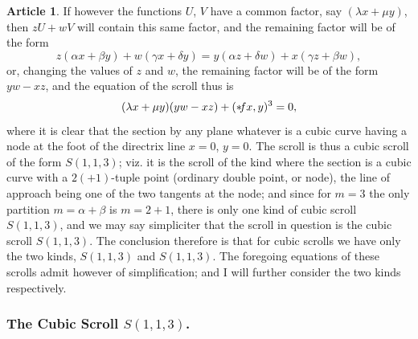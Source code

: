 \documentclass[12pt,a4paper]{article}
\theoremstyle{definition}
\newtheorem{art}{Article}[section]
\begin{document}
\begin{art}
If however the functions $U$, $V$ have a common factor, say $(\lambda x + \mu y)$, then $zU + wV$ will contain this same factor, and the remaining factor will be of the form
\[
z(\alpha x + \beta y) + w(\gamma x + \delta y) = y(\alpha z + \delta w) + x(\gamma z + \beta w),
\]
or, changing the values of $z$ and $w$, the remaining factor will be of the form $yw - xz$, and the equation of the scroll thus is
\[
(\lambda x + \mu y)(yw - xz) + (* \hspace{-2pt} fx, y)^3 = 0,
\]
where it is clear that the section by any plane whatever is a cubic curve having a node at the foot of the directrix line $x = 0$, $y = 0$. The scroll is thus a cubic scroll of the form $S(1, 1, 3)$; viz. it is the scroll of the kind where the section is a cubic curve with a $2 (+ 1)$-tuple point (ordinary double point, or node), the line of approach being one of the two tangents at the node; and since for $m = 3$ the only partition $m = \alpha + \beta$ is $m = 2 + 1$, there is only one kind of cubic scroll $S(1, 1, 3)$, and we may say simpliciter that the scroll in question is the cubic scroll $S(1, 1, 3)$. The conclusion therefore is that for cubic scrolls we have only the two kinds, $S(1, 1, 3)$ and $S(1, 1, 3)$. The foregoing equations of these scrolls admit however of simplification; and I will further consider the two kinds respectively.
\end{art}

\subsubsection*{The Cubic Scroll $S(1, 1, 3)$.}
\end{document}
